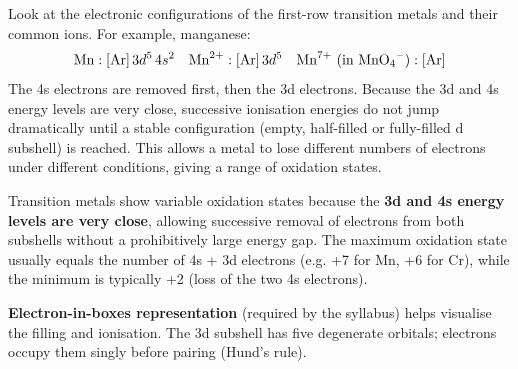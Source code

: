 \documentclass[11pt]{article}
\begin{document}
Look at the electronic configurations of the first-row transition metals and their common ions. For example, manganese:
\[
\ce{Mn}: [\ce{Ar}]\,3d^5\,4s^2 \quad \ce{Mn^{2+}}: [\ce{Ar}]\,3d^5 \quad \ce{Mn^{7+}} \text{ (in \ce{MnO4-})}: [\ce{Ar}]
\]
The 4s electrons are removed first, then the 3d electrons. Because the 3d and 4s energy levels are very close, successive ionisation energies do not jump dramatically until a stable configuration (empty, half-filled or fully-filled d subshell) is reached. This allows a metal to lose different numbers of electrons under different conditions, giving a range of oxidation states.

\begin{propriete}
Transition metals show variable oxidation states because the \textbf{3d and 4s energy levels are very close}, allowing successive removal of electrons from both subshells without a prohibitively large energy gap. The maximum oxidation state usually equals the number of 4s + 3d electrons (e.g. +7 for Mn, +6 for Cr), while the minimum is typically +2 (loss of the two 4s electrons).
\end{propriete}

\textbf{Electron-in-boxes representation} (required by the syllabus) helps visualise the filling and ionisation. The 3d subshell has five degenerate orbitals; electrons occupy them singly before pairing (Hund's rule).
\end{document}
